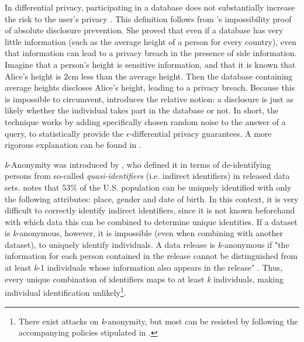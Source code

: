 In differential privacy, participating in a database does not substantially increase the risk to the user's privacy \citep{diff-privacy}.  This definition follows from \citeauthor{diff-privacy}'s impossibility proof of absolute disclosure prevention. She proved that even if a database has very little information (such as the average height of a person for every country), even that information can lead to a privacy breach in the presence of side information. Imagine that a person's height is sensitive information, and that it is known that Alice's height is 2cm less than the average height. Then the database containing average heights discloses Alice's height, leading to a privacy breach. Because this is impossible to circumvent, \citeauthor{Dwork} introduces the relative notion: a disclosure is just as likely whether the individual takes part in the database or not. In short, the technique works by adding specifically chosen random noise to the answer of a query, to statistically provide the \textit{$\epsilon$}-differential privacy guarantees. A more rigorous explanation can be found in \citet[p9-11]{diff-privacy}.

\textit{k}-Anonymity was introduced by \citet{k-anonymity}, who defined it in terms of de-identifying persons from so-called \textit{quasi-identifiers} (i.e. indirect identifiers) in released data sets. \citet{demographics-identify-unique} notes that 53\% of the U.S. population can be uniquely identified with only the following attributes: place, gender and date of birth. In this context, it is very difficult to correctly identify indirect identifiers, since it is not known beforehand with which data this can be combined to determine unique identities. If a dataset is \textit{k}-anonymous, however, it is impossible (even when combining with another dataset), to uniquely identify individuals. A data release is \textit{k}-anonymous if "the information for each person contained in the release cannot be distinguished from at least \textit{k}-1 individuals whose information also appears in the release" \citep{k-anonymity}. Thus, every unique combination of identifiers maps to at least \textit{k} individuals, making individual identification unlikely\footnote{There exist attacks on \textit{k}-anonymity, but most can be resisted by following the accompanying policies stipulated in \citet{k-anonymity}.}.

